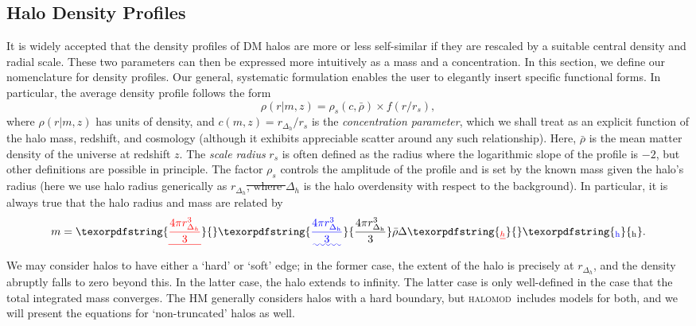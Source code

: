 \documentclass[5p,aas_macros]{elsarticle}
\newcommand{\halomod}{\textsc{halomod}\xspace} %
\providecommand{\DIFaddtex}[1]{{\protect\color{blue}\uwave{#1}}} %
\providecommand{\DIFdeltex}[1]{{\protect\color{red}\sout{#1}}}                      %
\providecommand{\DIFaddbegin}{} %
\providecommand{\DIFaddend}{} %
\providecommand{\DIFdelbegin}{} %
\providecommand{\DIFdelend}{} %
\providecommand{\DIFadd}[1]{\texorpdfstring{\DIFaddtex{#1}}{#1}} %
\providecommand{\DIFdel}[1]{\texorpdfstring{\DIFdeltex{#1}}{}} %
\begin{document}
\subsection{Halo Density Profiles}
\label{sec:profilestheory}
It is widely accepted that the density profiles of DM halos are more or less self-similar if they are rescaled by a suitable central density and radial scale. These two parameters can then be expressed more intuitively as a mass and a concentration. In this section, we define our nomenclature for density profiles. Our general, systematic formulation enables the user to elegantly insert specific functional forms. In particular, the average density profile follows the form
\begin{equation}
    \label{eq:universalprofile}
    \rho(r|m,z) = \rho_s(c, \bar{\rho}) \times f(r/r_s),
\end{equation}
where $\rho(r|m,z)$ has units of density, and \DIFdelbegin \DIFdel{$c(m,z) = r_{\Delta_h} / r_s$ }\DIFdelend \DIFaddbegin \DIFadd{$c(m,z) = r_{\Delta_{\rm h}} / r_s$ }\DIFaddend is the \textit{concentration parameter}, which we shall treat as an explicit function of the halo mass, redshift, and cosmology (although it exhibits appreciable scatter around any such relationship). Here, $\bar{\rho}$ is the mean matter density of the universe at redshift $z$.  The \textit{scale radius} $r_s$ is often defined as the radius where the logarithmic slope of the profile is $-2$, but other definitions are possible in principle. The factor $\rho_s$ controls the amplitude of the profile and is set by the known mass given the halo's radius (here we use halo radius generically as \DIFdelbegin \DIFdel{$r_{\Delta_h}$, where $\Delta_h$ }\DIFdelend \DIFaddbegin \DIFadd{$r_{\Delta_{\rm h}}$, where $\Delta_{\rm h}$ }\DIFaddend is the halo overdensity with respect to the background). In particular, it is always true that the halo radius and mass are related by
\begin{equation}
    \label{eq:mass-radius-halo}
    m = \DIFdelbegin \DIFdel{\frac{4\pi r^3_{\Delta_h}}{3} }\DIFdelend \DIFaddbegin \DIFadd{\frac{4\pi r^3_{\Delta_{\rm h}}}{3} }\DIFaddend \bar{\rho} \Delta\DIFdelbegin \DIFdel{_h}\DIFdelend \DIFaddbegin \DIFadd{_{\rm h}}\DIFaddend .
\end{equation}
We may consider halos to have either a `hard' or `soft' edge; in the former case, the extent of the halo is precisely at \DIFdelbegin \DIFdel{$r_{\Delta_h}$}\DIFdelend \DIFaddbegin \DIFadd{$r_{\Delta_{\rm h}}$}\DIFaddend , and the density abruptly falls to zero beyond this. In the latter case, the halo extends to infinity. The latter case is only well-defined in the case that the total integrated mass converges. The HM generally considers halos with a hard boundary, but \halomod\ includes models for both, and we will present the equations for `non-truncated' halos as well.
\end{document}
